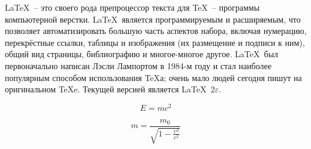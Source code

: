 \documentclass[a4paper, 12pt]{article} %
\begin{document}
\LaTeX \  -- это своего рода препроцессор текста для \TeX \ -- программы компьютерной верстки. \LaTeX \ является программируемым и расширяемым, что позволяет автоматизировать большую часть аспектов набора, включая нумерацию, перекрёстные ссылки, таблицы и изображения (их размещение и подписи к ним), общий вид страницы, библиографию и многое-многое другое. \LaTeX \ был первоначально написан Лэсли Лампортом в 1984-м году и стал наиболее популярным способом использования \TeX а; очень мало людей сегодня пишут на оригинальном \TeX e. Текущей версией является \LaTeX \ 2$\varepsilon$.

\begin{equation}
    E = mc^2
\end{equation}

\begin{equation}
    m = \frac{m_{0}}{\sqrt{1 - \frac{\upsilon^2}{c^2}}}
\end{equation}
\end{document}
